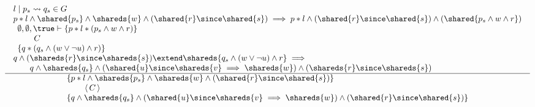 \[
\begin{array}{c}
  \begin{array}{l}
    l \mid p_s \leadsto q_s \in G
    \\
    p * l \land \shared{p_s} \land \shareds{w} 
    \land (\shared{r} \since \shared{s}) 
    \implies
    p * l      
    \land (\shared{r} \since \shared{s} )
    \land (\shared{p_s \land w \land r} ) 
    \\
    \begin{array}{l}
    \emptyset,\emptyset,\true \vdash\{p*l *(p_s 
    \land 
    w \land r) \}
    \\
    \qquad  C 
    \\
    \{q * 
    (q_s
    \land 
    (w \lor \neg u) 
    \land 
    r) \}
    \end{array} 
     \\ 
     q \land (\shareds{r} \since \shareds{s}) \extend \shareds{q_s \land (w \lor \neg u) \land r}
     \implies \mbox{}\\
     \qquad
     q \land \shareds{q_s} \land (\shared{u} \since \shareds{v} \implies \shareds{w}) \land (\shareds{r} \since \shareds{s})
    \end{array}\\
  \hline
  \begin{array}{l}
  \{p*l \land \shareds{p_s} 
  \land 
  \shareds{w} 
  \land (\shared{r} \since \shared{s}) \}
  \\
  \qquad \,\langle\, C \,\rangle\,
  \\
  \{q \land \shareds{q_s} 
  \land 
  (\shared{u} \since \shareds{v} \implies \shareds{w}) 
  \land (\shared{r} \since \shared{s}) \}
  \end{array}
\end{array}
\]

